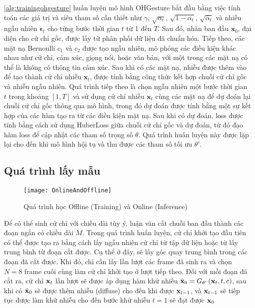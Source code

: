 \autoref{alg:trainingohgesture} huấn luyện mô hình OHGesture bắt đầu bằng việc tính toán các giá trị và siêu tham số cần thiết như $\gamma$, $\sqrt{\alpha_t}$, $\sqrt{1 - \alpha_t}$, $\sqrt{\bar{\alpha}_t}$ và nhiễu ngẫu nhiên $\boldsymbol{\epsilon}_t$ cho từng bước thời gian $t$ từ 1 đến $T$. Sau đó, nhãn ban đầu $\mathbf{x}_0$, đại diện cho cử chỉ gốc, được lấy từ phân phối dữ liệu đã chuẩn hóa. Tiếp theo, các mặt nạ Bernoulli $c_1$ và $c_2$ được tạo ngẫu nhiên, mô phỏng các điều kiện khác nhau như cử chỉ, cảm xúc, giọng nói, hoặc văn bản, với một trong các mặt nạ có thể là không có thông tin cảm xúc. Sau khi có các mặt nạ, nhiễu được thêm vào để tạo thành cử chỉ nhiễu $\mathbf{x}_t$, được tính bằng công thức kết hợp chuỗi cử chỉ gốc và nhiễu ngẫu nhiên. Quá trình tiếp theo là chọn ngẫu nhiên một bước thời gian $t$ trong khoảng $[1, T]$ và sử dụng cử chỉ nhiễu $\mathbf{x}_t$ cùng các mặt nạ để dự đoán lại chuỗi cử chỉ gốc thông qua mô hình, trong đó dự đoán được tính bằng một sự kết hợp của các hàm tạo ra từ các điều kiện mặt nạ. Sau khi có dự đoán, loss được tính bằng cách sử dụng HuberLoss giữa chuỗi cử chỉ gốc và dự đoán, từ đó đạo hàm loss để cập nhật các tham số trọng số $\theta$. Quá trình huấn luyện này được lặp lại cho đến khi mô hình hội tụ và thu được các tham số tối ưu $\theta'$.


\subsection{Quá trình lấy mẫu}

\begin{figure}[H]
	\centering
	\texttt{[image: OnlineAndOffline]}
	\caption{Quá trình học Offline (Training) và Online (Inference)}
	\label{fig:OnlineAndOffline}
\end{figure}

Để có thể sinh cử chỉ với chiều dài tùy ý, luận văn cắt chuỗi ban đầu thành các đoạn ngắn có chiều dài $M$. Trong quá trình huấn luyện, cử chỉ khởi tạo đầu tiên có thể được tạo ra bằng cách lấy ngẫu nhiên cử chỉ từ tập dữ liệu hoặc từ lấy trung bình từ đoạn cắt được. Cụ thể ở đây, sẽ lấy góc quay trung bình trong các đoạn đã cắt được. Khi đó, chỉ cần lấy lần lượt các frame đã sinh ra và chọn $N = 8$ frame cuối cùng làm cử chỉ khởi tạo ở lượt tiếp theo. Đối với mỗi đoạn đã cắt ra, cử chỉ $\mathbf{x}_{t}$ lần lượt sẽ được áp dụng hàm khử nhiều $\hat{\mathbf{x}}_{0} = G_{\theta'} \left( \mathbf{x}_{t}, t, c\right)$, sau khi có $\hat{\mathbf{x}}_{0}$ sẽ được thêm nhiễu (diffuse) cho đến khi được  $\mathbf{x}_{t-1}$, và $\mathbf{x}_{t-1}$ sẽ tiếp tục được làm khử nhiễu cho đến bước khử nhiễu $t=1$ sẽ đạt được $\mathbf{x}_{0}$ 

